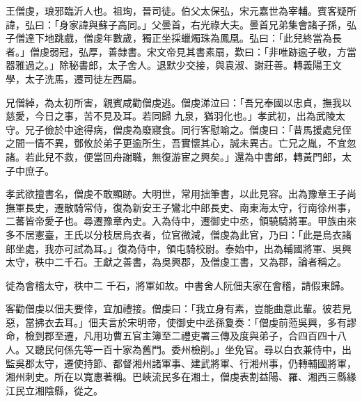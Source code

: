 
\begin{pinyinscope}

 王僧虔，琅邪臨沂人也。祖珣，晉司徒。伯父太保弘，宋元嘉世為宰輔。賓客疑所諱，弘曰：「身家諱與蘇子高同。」父曇首，右光祿大夫。曇首兄弟集會諸子孫，弘子僧達下地跳戲，僧虔年數歲，獨正坐採蠟燭珠為鳳凰。弘曰：「此兒終當為長者。」僧虔弱冠，弘厚，善隸書。宋文帝見其書素扇，歎曰：「非唯跡逾子敬，方當器雅過之。」除秘書郎，太子舍人。退默少交接，與袁淑、謝莊善。轉義陽王文學，太子洗馬，遷司徒左西屬。



 兄僧綽，為太初所害，親賓咸勸僧虔逃。僧虔涕泣曰：「吾兄奉國以忠貞，撫我以慈愛，今日之事，苦不見及耳。若同歸
 九泉，猶羽化也。」孝武初，出為武陵太守。兄子儉於中途得病，僧虔為廢寢食。同行客慰喻之。僧虔曰：「昔馬援處兒侄之間一情不異，鄧攸於弟子更逾所生，吾實懷其心，誠未異古。亡兄之胤，不宜忽諸。若此兒不救，便當回舟謝職，無復游宦之興矣。」還為中書郎，轉黃門郎，太子中庶子。



 孝武欲擅書名，僧虔不敢顯跡。大明世，常用拙筆書，以此見容。出為豫章王子尚撫軍長史，遷散騎常侍，復為新安王子鸞北中郎長史、南東海太守，行南徐州事，二蕃皆帝愛子也。尋遷豫章內史。入為侍中，遷御史中丞，領驍騎將軍。甲族由來多不居憲臺，王氏以分枝居烏衣者，位官微減，僧虔為此官，乃曰：「此是烏衣諸郎坐處，我亦可試為耳。」復為侍中，領屯騎校尉。泰始中，出為輔國將軍、吳興太守，秩中二千石。王獻之善書，為吳興郡，及僧虔工書，又為郡，論者稱之。



 徙為會稽太守，秩中二
 千石，將軍如故。中書舍人阮佃夫家在會稽，請假東歸。



 客勸僧虔以佃夫要倖，宜加禮接。僧虔曰：「我立身有素，豈能曲意此輩。彼若見惡，當拂衣去耳。」佃夫言於宋明帝，使御史中丞孫夐奏：「僧虔前蒞吳興，多有謬命，檢到郡至遷，凡用功曹五官主簿至二禮吏署三傳及度與弟子，合四百四十八人。又聽民何係先等一百十家為舊門。委州檢削。」坐免官。尋以白衣兼侍中，出監吳郡太守，遷使持節、都督湘州諸軍事、建武將軍、行湘州事，仍轉輔國將軍，湘州刺史。所在以寬惠著稱。巴峽流民多在湘土，僧虔表割益陽、羅、湘西三縣緣江民立湘陰縣，從之。




\end{pinyinscope}
